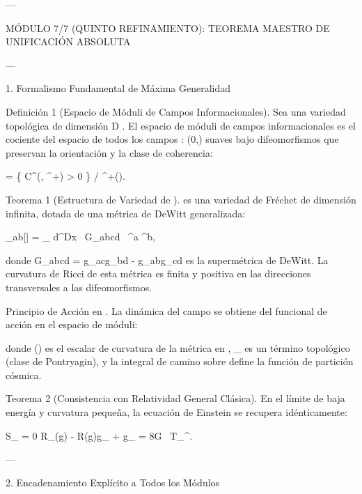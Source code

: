 \documentclass[12pt,twoside]{book}
\begin{document}
---

MÓDULO 7/7 (QUINTO REFINAMIENTO): TEOREMA MAESTRO DE UNIFICACIÓN ABSOLUTA

---

1. Formalismo Fundamental de Máxima Generalidad

Definición 1 (Espacio de Móduli de Campos Informacionales). Sea    una variedad topológica de dimensión  D . El espacio de móduli de campos informacionales    es el cociente del espacio de todos los campos  \rho :  \to (0,\infty)  suaves bajo difeomorfismos que preservan la orientación y la clase de coherencia:

 = \{ \rho \in C^\infty(, ^+) \mid \rho > 0 \} / ^+().

Teorema 1 (Estructura de Variedad de   ).    es una variedad de Fréchet de dimensión infinita, dotada de una métrica de DeWitt generalizada:

_{ab}[\rho] = \int_{} d^Dx  \, G_{abcd} \, \delta \rho^a \delta \rho^b,

donde  G_{abcd} = g_{ac}g_{bd} - g_{ab}g_{cd}  es la supermétrica de DeWitt. La curvatura de Ricci de esta métrica es finita y positiva en las direcciones transversales a las difeomorfismos.

Principio de Acción en   . La dinámica del campo se obtiene del funcional de acción en el espacio de móduli:


donde  ()  es el escalar de curvatura de la métrica    en   ,  _{}  es un término topológico (clase de Pontryagin), y la integral de camino sobre    define la función de partición cósmica.

Teorema 2 (Consistencia con Relatividad General Clásica). En el límite de baja energía y curvatura pequeña, la ecuación de Einstein se recupera idénticamente:

\delta S_{} = 0 \implies R_{\mu\nu}(g) - R(g)g_{\mu\nu} + \Lambda g_{\mu\nu} = 8\pi G \, T_{\mu\nu}^{}.

---

2. Encadenamiento Explícito a Todos los Módulos
\end{document}
